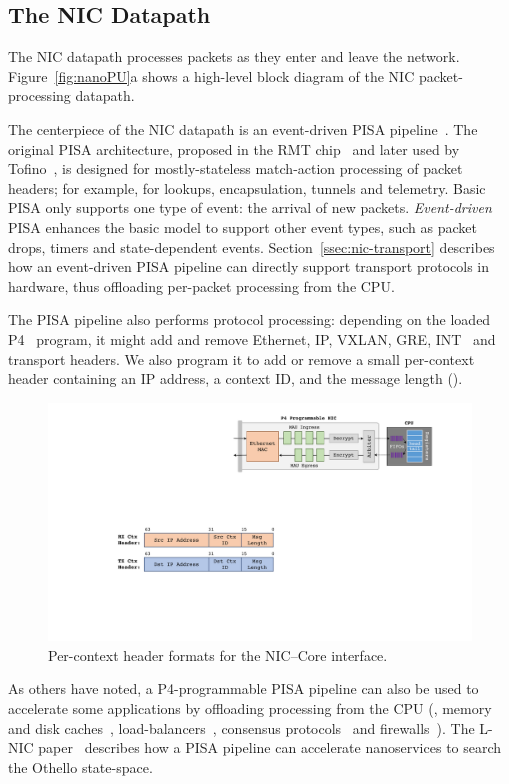 \subsection{The NIC Datapath}
\label{ssec:nic-datapath}
The NIC datapath processes packets as they enter and leave the network.
Figure~\ref{fig:nanoPU}a shows a high-level block diagram of the NIC packet-processing datapath.

The centerpiece of the NIC datapath is an event-driven PISA pipeline~\cite{event-driven-pisa}. 
The original PISA architecture, proposed in the RMT chip~\cite{RMT} and later used by Tofino~\cite{tofino}, is designed for mostly-stateless match-action processing of packet headers; for example, for lookups, encapsulation, tunnels and telemetry.
Basic PISA only supports one type of event: the arrival of new packets. 
{\em Event-driven} PISA enhances the basic model to support other event types, such as packet drops, timers and state-dependent events. 
Section~\ref{ssec:nic-transport} describes how an event-driven PISA pipeline can directly support transport protocols in hardware, thus offloading per-packet processing from the CPU. 

The PISA pipeline also performs protocol processing: depending on the loaded P4~\cite{P4} program, it might add and remove Ethernet, IP, VXLAN, GRE, INT~\cite{INT} and transport headers. 
We also program it to add or remove a small per-context header containing an IP address, a context ID, and the message length ().

\begin{figure}
 \includegraphics[width=0.95\linewidth]{./figures/ctx-hdr-fmt}
 \caption{Per-context header formats for the NIC--Core interface.}
 \label{fig:app-headers}
\end{figure}

As others have noted, a P4-programmable PISA pipeline can also be used to accelerate some applications by offloading processing from the CPU (\eg, memory and disk caches~\cite{netcache}, load-balancers~\cite{silkroad}, consensus protocols~\cite{netchain} and firewalls~\cite{p4-firewall}). 
The L-NIC paper~\cite{lnic} describes how a PISA pipeline can accelerate nanoservices to search the Othello state-space.

